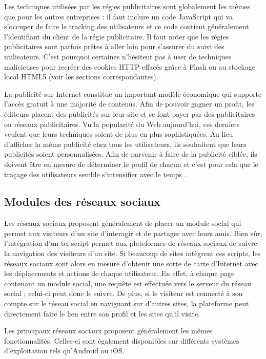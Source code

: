 Les techniques utilisées par les régies publicitaires sont globalement les mêmes que pour les autres entreprises : il faut inclure un code JavaScript qui va s'occuper de faire le tracking des utilisateurs et ce code contient généralement l'identifiant du client de la régie publicitaire. Il faut noter que les régies publicitaires sont parfois prêtes à aller loin pour s'assurer du suivi des utilisateurs. C'est pourquoi certaines n'hésitent pas à user de techniques malicieuses pour recréer des cookies HTTP effacés grâce à Flash ou au stockage local HTML5 (voir les sections correspondantes).
\newline

La publicité sur Internet constitue un important modèle économique qui supporte l'accès gratuit à une majorité de contenus. Afin de pouvoir gagner un profit, les éditeurs placent des publicités sur leur site et se font payer par des publicitaires ou réseaux publicitaires. Vu la popularité du Web aujourd'hui, ces derniers veulent que leurs techniques soient de plus en plus sophistiquées. Au lieu d'afficher la même publicité chez tous les utilisateurs, ils souhaitent que leurs publicités soient personnalisées. Afin de parvenir à faire de la publicité ciblée, ils doivent être en mesure de déterminer le profil de chacun et c'est pour cela que le traçage des utilisateurs semble s'intensifier avec le temps \cite{Tran:2012:TTF:2352593.2352627}.

\subsection{Modules des réseaux sociaux}
Les réseaux sociaux proposent généralement de placer un module social qui permet aux visiteurs d'un site d'interagir et de partager avec leurs amis. Bien sûr, l'intégration d'un tel script permet aux plateformes de réseaux sociaux de suivre la navigation des visiteurs d'un site. Si beaucoup de sites intègrent ces scripts, les réseaux sociaux sont alors en mesure d'obtenir une sorte de carte d'Internet avec les déplacements et actions de chaque utilisateur. En effet, à chaque page contenant un module social, une requête est effectuée vers le serveur du réseau social ; celui-ci peut donc le suivre. De plus, si le visiteur est connecté à son compte sur le réseau social en naviguant sur d'autres sites, la plateforme peut directement faire le lien entre son profil et les sites qu'il visite.
\newline

Les principaux réseaux sociaux proposent généralement les mêmes fonctionnalités. Celles-ci sont également disponibles sur différents systèmes d'exploitation tels qu'Android ou iOS.

